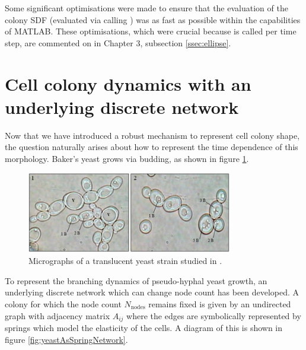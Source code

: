 Some significant optimisations were made to ensure that the evaluation of 
the colony SDF (evaluated via calling ) was as fast as 
possible within the capabilities of MATLAB. These 
optimisations, which were crucial because  is called per time step, 
are commented on in Chapter 3, subsection \ref{ssec:ellipse}.

\section{Cell colony dynamics with an underlying discrete network}
Now that we have introduced a robust mechanism to represent cell colony 
shape, the question naturally arises about how to represent the time dependence of this 
morphology. Baker's yeast grows via budding,
as shown in figure \ref{fig:yeastMicrograph}.
\begin{figure}[!htb]
    \centering
    \includegraphics[width=0.8\textwidth]{chapter2/figures/yeastMicrograph.png}
    \caption{Micrographs of a translucent yeast strain studied
             in \cite{ebrahimi2020yeast}.}
    \label{fig:yeastMicrograph}
\end{figure}
To represent the branching dynamics of pseudo-hyphal yeast growth, 
an underlying discrete network which can change node count has been developed.
A colony for which the node count $N_{\textrm{nodes}}$ remains fixed is given 
by an undirected graph with adjacency matrix $A_{ij}$ where the edges are symbolically
represented by springs which model the elasticity of the cells. 
A diagram of this is shown in figure \ref{fig:yeastAsSpringNetwork}. 
